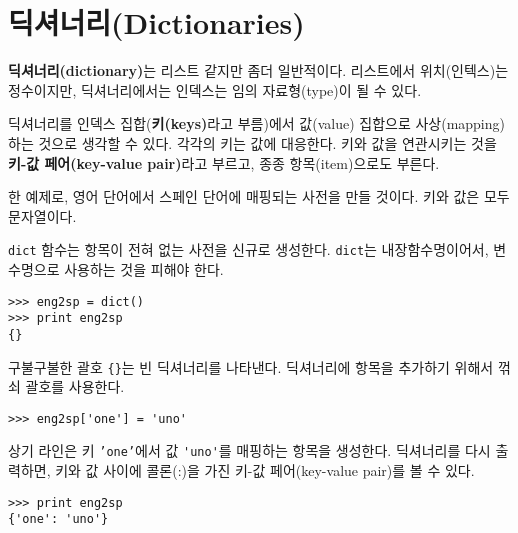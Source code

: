 
\chapter{딕셔너리(Dictionaries)}


{\bf 딕셔너리(dictionary)}는 리스트 같지만 좀더 일반적이다. 
리스트에서 위치(인텍스)는 정수이지만, 딕셔너리에서는 인덱스는 임의 자료형(type)이 될 수 있다.

딕셔너리를 인덱스 집합({\bf 키(keys)}라고 부름)에서 값(value) 집합으로 사상(mapping)하는 것으로 생각할 수 있다. 
각각의 키는 값에 대응한다. 
키와 값을 연관시키는 것을 {\bf 키-값 페어(key-value pair)}라고 부르고, 종종 항목(item)으로도 부른다.

한 예제로, 영어 단어에서 스페인 단어에 매핑되는 사전을 만들 것이다. 
키와 값은 모두 문자열이다.

{\tt dict} 함수는 항목이 전혀 없는 사전을 신규로 생성한다. 
{\tt dict}는 내장함수명이어서, 변수명으로 사용하는 것을 피해야 한다.


\beforeverb
\begin{verbatim}
>>> eng2sp = dict()
>>> print eng2sp
{}
\end{verbatim}
\afterverb

구불구불한 괄호 \verb"{}"는 빈 딕셔너리를 나타낸다. 
딕셔너리에 항목을 추가하기 위해서 꺾쇠 괄호를 사용한다.


\beforeverb
\begin{verbatim}
>>> eng2sp['one'] = 'uno'
\end{verbatim}
\afterverb
%

상기 라인은 키 {\tt 'one'}에서 값 \verb"'uno'"를 매핑하는 항목을 생성한다. 
딕셔너리를 다시 출력하면, 키와 값 사이에 콜론(:)을 가진 키-값 페어(key-value pair)를 볼 수 있다.

\beforeverb
\begin{verbatim}
>>> print eng2sp
{'one': 'uno'}
\end{verbatim}
\afterverb
%


